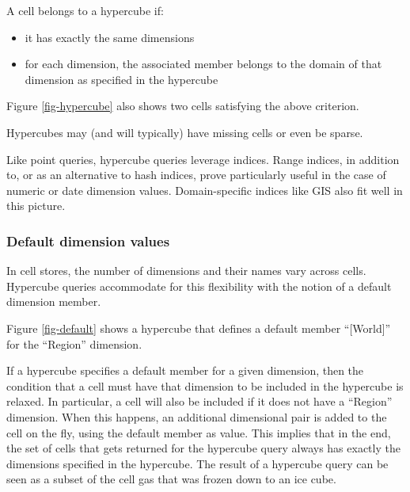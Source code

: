 \documentclass{acm_proc_article-sp}
\begin{document}
A cell belongs to a hypercube if:

\vspace{-\topsep}
\begin{itemize}
\item it has exactly the same dimensions
\item for each dimension, the associated member belongs to the domain of that dimension as specified in the hypercube
\end{itemize}

Figure \ref{fig-hypercube} also shows two cells satisfying the above criterion.

Hypercubes may (and will typically) have missing cells or even be sparse.

Like point queries, hypercube queries leverage indices. Range indices, in addition to, or as an alternative to hash indices, prove particularly useful in the case of numeric or date dimension values. Domain-specific indices like GIS also fit well in this picture.

\subsubsection{Default dimension values}

In cell stores, the number of dimensions and their names vary across cells. Hypercube queries accommodate for this flexibility with the notion of a default dimension member.

Figure \ref{fig-default} shows a hypercube that defines a default member ``[World]'' for the ``Region'' dimension.

If a hypercube specifies a default member for a given dimension, then the condition that a cell must have that dimension to be included in the hypercube is relaxed. In particular, a cell will also be included if it does not have a ``Region'' dimension. When this happens, an additional dimensional pair is added to the cell on the fly, using the default member as value. This implies that in the end, the set of cells that gets returned for the hypercube query always has exactly the dimensions specified in the hypercube. The result of a hypercube query can be seen as a subset of the cell gas that was frozen down to an ice cube.
\end{document}
